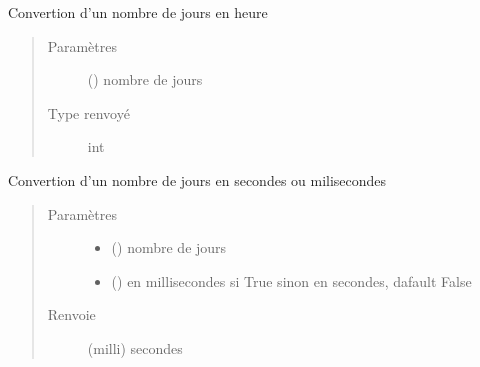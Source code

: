 \documentclass[letterpaper,10pt,french]{sphinxmanual}
\begin{document}
\begin{fulllineitems}
\label{\detokenize{modules/dtemng:toolbox.dtemng.day_in_hour}}
Convertion d’un nombre de jours en heure
\begin{quote}\begin{description}
\item[{Paramètres}] \leavevmode
{} () \textendash{} nombre de jours

\item[{Type renvoyé}] \leavevmode
int

\end{description}\end{quote}

\end{fulllineitems}


\begin{fulllineitems}
\label{\detokenize{modules/dtemng:toolbox.dtemng.day_in_sec}}
Convertion d’un nombre de jours en secondes ou milisecondes
\begin{quote}\begin{description}
\item[{Paramètres}] \leavevmode\begin{itemize}
\item {} 
 () \textendash{} nombre de jours

\item {} 
 () \textendash{} en millisecondes si True sinon en secondes, dafault False

\end{itemize}

\item[{Renvoie}] \leavevmode
(milli) secondes

\end{description}\end{quote}

\end{fulllineitems}
\end{document}

